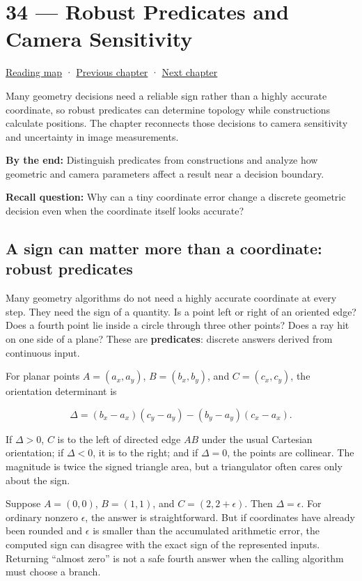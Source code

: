 \hypertarget{02-foundations-ii-ch034}{}
\section{34 --- Robust Predicates and Camera Sensitivity}\label{robust-predicates-and-camera-sensitivity}

\href{Chapter\%20Edition/01\%20-\%20Computing\%20Foundations/00\%20-\%20Reading\%20Map}{Reading map} · \hyperref[02-foundations-ii-ch033]{Previous chapter} · \hyperref[02-foundations-ii-ch035]{Next chapter}

Many geometry decisions need a reliable sign rather than a highly accurate coordinate, so robust predicates can determine topology while constructions calculate positions. The chapter reconnects those decisions to camera sensitivity and uncertainty in image measurements.

\textbf{By the end:} Distinguish predicates from constructions and analyze how geometric and camera parameters affect a result near a decision boundary.

\textbf{Recall question:} Why can a tiny coordinate error change a discrete geometric decision even when the coordinate itself looks accurate?

\subsection{A sign can matter more than a coordinate: robust predicates}\label{a-sign-can-matter-more-than-a-coordinate-robust-predicates}

Many geometry algorithms do not need a highly accurate coordinate at every step. They need the sign of a quantity. Is a point left or right of an oriented edge? Does a fourth point lie inside a circle through three other points? Does a ray hit on one side of a plane? These are \textbf{predicates}: discrete answers derived from continuous input.

For planar points \(A=(a_x,a_y)\), \(B=(b_x,b_y)\), and \(C=(c_x,c_y)\), the orientation determinant is

\[
\Delta = (b_x-a_x)(c_y-a_y)-(b_y-a_y)(c_x-a_x).
\]

If \(\Delta>0\), \(C\) is to the left of directed edge \(AB\) under the usual Cartesian orientation; if \(\Delta<0\), it is to the right; and if \(\Delta=0\), the points are collinear. The magnitude is twice the signed triangle area, but a triangulator often cares only about the sign.

Suppose \(A=(0,0)\), \(B=(1,1)\), and \(C=(2,2+\epsilon)\). Then \(\Delta=\epsilon\). For ordinary nonzero \(\epsilon\), the answer is straightforward. But if coordinates have already been rounded and \(\epsilon\) is smaller than the accumulated arithmetic error, the computed sign can disagree with the exact sign of the represented inputs. Returning ``almost zero'' is not a safe fourth answer when the calling algorithm must choose a branch.

